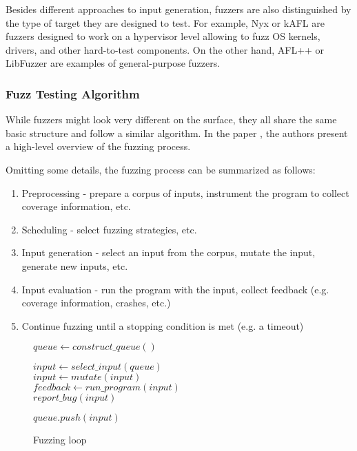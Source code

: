 Besides different approaches to input generation, fuzzers are also distinguished by the type of target they are designed to test. For example, Nyx \cite{nyx-hypervisor-fuzzer-usenix21} or kAFL \cite{kafl-usenix17} are fuzzers designed to work on a hypervisor level allowing to fuzz OS kernels, drivers, and other hard-to-test components. On the other hand, AFL++ or LibFuzzer are examples of general-purpose fuzzers.

\subsubsection{Fuzz Testing Algorithm}

While fuzzers might look very different on the surface, they all share the same basic structure and follow a similar algorithm. In the paper \cite{the-art-science-and-engineering-of-fuzzing-a-survey}, the authors present a high-level overview of the fuzzing process.

Omitting some details, the fuzzing process can be summarized as follows:

\begin{enumerate}
	\item Preprocessing - prepare a corpus of inputs, instrument the program to collect coverage information, etc.
	\item Scheduling - select fuzzing strategies, etc.
	\item Input generation - select an input from the corpus, mutate the input, generate new inputs, etc.
	\item Input evaluation - run the program with the input, collect feedback (e.g. coverage information, crashes, etc.)
	\item Continue fuzzing until a stopping condition is met (e.g. a timeout)
\end{enumerate}

\begin{figure}[ht]
	\centering
	\begin{minipage}{.7\linewidth}
		\begin{algorithm}[H]
			\caption{Fuzzing loop}
			\label{alg:fuzzing-loop}
			$queue \gets construct\_queue()$ \\
			 {
				$input \gets select\_input(queue)$ \\
				$input \gets mutate(input)$ \\
				$feedback \gets run\_program(input)$ \\
				 {
					$report\_bug(input)$ \\
				}

				 {
					$queue.push(input)$ \\
				}
			}
		\end{algorithm}
	\end{minipage}
\end{figure}

